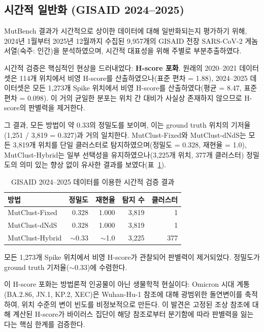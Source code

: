 \subsection{시간적 일반화 (GISAID 2024--2025)}
\label{sec:temporal}


MutBench 결과가 시간적으로 상이한 데이터에 대해 일반화되는지 평가하기 위해, 2024년 1월부터 2025년 12월까지 수집된 9,957개의 GISAID 전장 SARS-CoV-2 게놈 서열(숙주: 인간)을 분석하였으며, 시간적 대표성을 위해 주별로 부분추출하였다.

시간적 검증은 핵심적인 현상을 드러내었다: \textbf{H-score 포화}.
원래의 2020--2021 데이터셋은 114개 위치에서 비영 H-score를 산출하였으나(표준 편차 = 1.88), 2024--2025 데이터셋은 모든 1,273개 Spike 위치에서 비영 H-score를 산출하였다(평균 = 8.47, 표준 편차 = 0.098).
이 거의 균일한 분포는 위치 간 대비가 사실상 존재하지 않으므로 H-score의 판별력을 제거한다.

그 결과, 모든 방법이 약 0.33의 정밀도를 보이며, 이는 ground truth 위치의 기저율(1,251 / 3,819 = 0.327)과 거의 일치한다.
MutClust-Fixed와 MutClust-dNdS는 모든 3,819개 위치를 단일 클러스터로 탐지하였으며(정밀도 = 0.328, 재현율 = 1.0), MutClust-Hybrid는 일부 선택성을 유지하였으나(3,225개 위치, 377개 클러스터) 정밀도의 의미 있는 향상 없이 유사한 결과를 보였다(표~\ref{tab:temporal}).

\begin{table}[htbp]
\centering
\caption{GISAID 2024--2025 데이터를 이용한 시간적 검증 결과}
\label{tab:temporal}
\begin{tabular}{lrrrr}
\toprule
\textbf{방법} & \textbf{정밀도} & \textbf{재현율} & \textbf{탐지 수} & \textbf{클러스터} \\
\midrule
MutClust-Fixed & 0.328 & 1.000 & 3,819 & 1 \\
MutClust-dNdS & 0.328 & 1.000 & 3,819 & 1 \\
MutClust-Hybrid & $\sim$0.33 & $\sim$1.0 & 3,225 & 377 \\
\bottomrule
\end{tabular}
\begin{minipage}{\textwidth}
\smallskip
\footnotesize 모든 1,273개 Spike 위치에서 비영 H-score가 관찰되어 판별력이 제거되었다. 정밀도가 ground truth 기저율($\sim$0.33)에 수렴한다.
\end{minipage}
\end{table}

이 H-score 포화는 방법론적 인공물이 아닌 생물학적 현실이다: Omicron 시대 계통(BA.2.86, JN.1, KP.2, XEC)은 Wuhan-Hu-1 참조에 대해 광범위한 돌연변이를 축적하여, 위치 수준의 변이 빈도를 비정보적으로 만든다.
이 발견은 고정된 조상 참조에 대해 계산된 H-score가 바이러스 집단이 해당 참조로부터 분기함에 따라 판별력을 잃는다는 핵심 한계를 검증한다.


